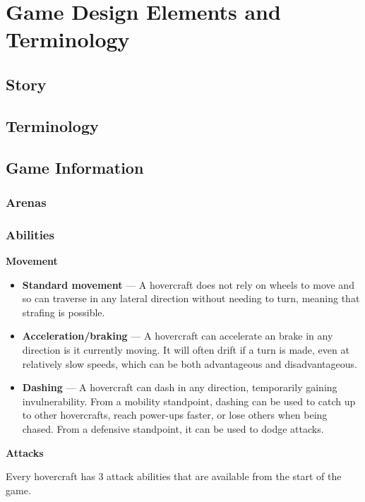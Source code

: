 \documentclass{article}
\theoremstyle{definition}
\begin{document}
\section{Game Design Elements and Terminology}
\subsection{Story}


\subsection{Terminology}
\subsection{Game Information}
\subsubsection{Arenas}

\subsubsection{Abilities}

\textbf{Movement}

\begin{itemize}
  \item \textbf{Standard movement} --- A hovercraft does not rely on wheels to
    move and so can traverse in any lateral direction without needing to turn,
    meaning that strafing is possible.
  \item \textbf{Acceleration/braking} --- A hovercraft can accelerate an brake
    in any direction is it currently moving. It will often drift if a turn is
    made, even at relatively slow speeds, which can be both advantageous and
    disadvantageous.
  \item \textbf{Dashing} --- A hovercraft can dash in any direction,
    temporarily gaining invulnerability. From a mobility standpoint, dashing
    can be used to catch up to other hovercrafts, reach power-ups faster, or
    lose others when being chased. From a defensive standpoint, it can be used
    to dodge attacks.
\end{itemize}

\textbf{Attacks}

Every hovercraft has 3 attack abilities that are available from the start of
the game.
\end{document}
